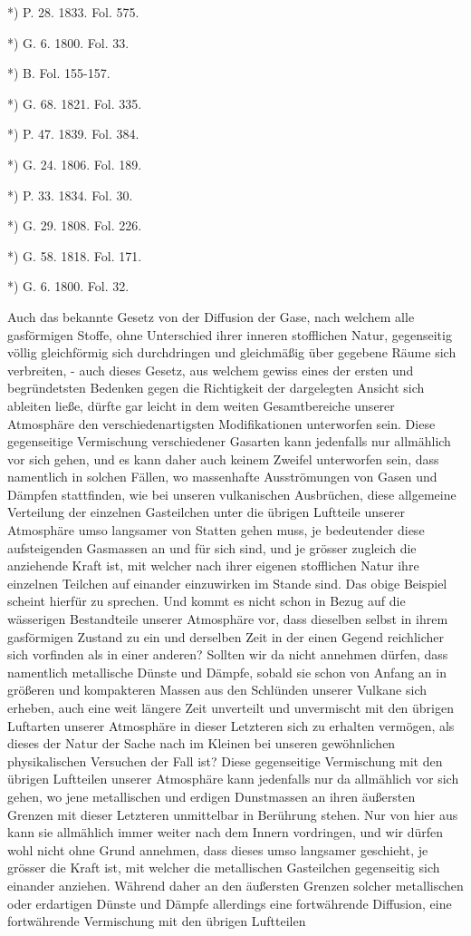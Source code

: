 \documentclass[a4paper, 11pt, oneside, polutonikogreek, german]{article}
\begin{document}
*) P. 28. 1833. Fol. 575.

*) G. 6. 1800. Fol. 33.

*) B. Fol. 155-157.

*) G. 68. 1821. Fol. 335.

*) P. 47. 1839. Fol. 384.

*) G. 24. 1806. Fol. 189.

*) P. 33. 1834. Fol. 30.

*) G. 29. 1808. Fol. 226.

*) G. 58. 1818. Fol. 171.

*) G. 6. 1800. Fol. 32.

Auch das bekannte Gesetz von der Diffusion der Gase, nach welchem alle gasförmigen Stoffe, ohne Unterschied ihrer inneren stofflichen Natur, gegenseitig völlig gleichförmig sich durchdringen und gleichmäßig über gegebene Räume sich verbreiten, - auch dieses Gesetz, aus welchem gewiss eines der ersten und begründetsten Bedenken gegen die Richtigkeit der dargelegten Ansicht sich ableiten ließe, dürfte gar leicht in dem weiten Gesamtbereiche unserer Atmosphäre den verschiedenartigsten Modifikationen unterworfen sein. Diese gegenseitige Vermischung verschiedener Gasarten kann jedenfalls nur allmählich vor sich gehen, und es kann daher auch keinem Zweifel unterworfen sein, dass namentlich in solchen Fällen, wo massenhafte Ausströmungen von Gasen und Dämpfen stattfinden, wie bei unseren vulkanischen Ausbrüchen, diese allgemeine Verteilung der einzelnen Gasteilchen unter die übrigen Luftteile unserer Atmosphäre umso langsamer von Statten gehen muss, je bedeutender diese aufsteigenden Gasmassen an und für sich sind, und je grösser zugleich die anziehende Kraft ist, mit welcher nach ihrer eigenen stofflichen Natur ihre einzelnen Teilchen auf einander einzuwirken im Stande sind. Das obige Beispiel scheint hierfür zu sprechen. Und kommt es nicht schon in Bezug auf die wässerigen Bestandteile unserer Atmosphäre vor, dass dieselben selbst in ihrem gasförmigen Zustand zu ein und derselben Zeit in der einen Gegend reichlicher sich vorfinden als in einer anderen? Sollten wir da nicht annehmen dürfen, dass namentlich metallische Dünste und Dämpfe, sobald sie schon von Anfang an in größeren und kompakteren Massen aus den Schlünden unserer Vulkane sich erheben, auch eine weit längere Zeit unverteilt und unvermischt mit den übrigen Luftarten unserer Atmosphäre in dieser Letzteren sich zu erhalten vermögen, als dieses der Natur der Sache nach im Kleinen bei unseren gewöhnlichen physikalischen Versuchen der Fall ist? Diese gegenseitige Vermischung mit den übrigen Luftteilen unserer Atmosphäre kann jedenfalls nur da allmählich vor sich gehen, wo jene metallischen und erdigen Dunstmassen an ihren äußersten Grenzen mit dieser Letzteren unmittelbar in Berührung stehen. Nur von hier aus kann sie allmählich immer weiter nach dem Innern vordringen, und wir dürfen wohl nicht ohne Grund annehmen, dass dieses umso langsamer geschieht, je grösser die Kraft ist, mit welcher die metallischen Gasteilchen gegenseitig sich einander anziehen. Während daher an den äußersten Grenzen solcher metallischen oder erdartigen Dünste und Dämpfe allerdings eine fortwährende Diffusion, eine fortwährende Vermischung mit den übrigen Luftteilen 
\end{document}
